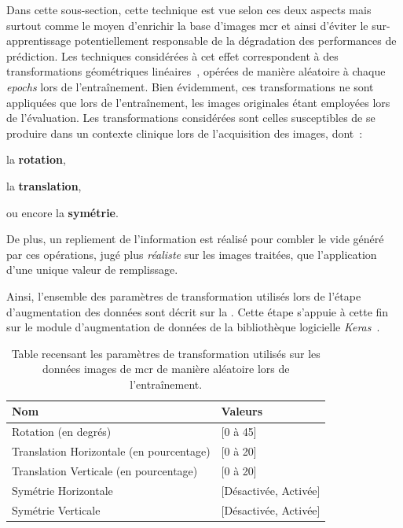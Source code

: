 Dans cette sous-section, cette technique est vue selon ces deux aspects mais surtout comme le moyen d'enrichir la base d'images \gls{mcr} et ainsi d'éviter le sur-apprentissage potentiellement responsable de la dégradation des performances de prédiction. Les techniques considérées à cet effet correspondent à des transformations géométriques linéaires~\cite{Taylor2018}, opérées de manière aléatoire à chaque \textit{epochs} lors de l'entraînement. Bien évidemment, ces transformations ne sont appliquées que lors de l'entraînement, les images originales étant employées lors de l'évaluation. Les transformations considérées sont celles susceptibles de se produire dans un contexte clinique lors de l'acquisition des images, dont~:
\begin{inlinerate}
    \item la \textbf{rotation},
    \item la \textbf{translation},
    \item ou encore la \textbf{symétrie}.
\end{inlinerate} De plus, un repliement de l'information est réalisé pour combler le vide généré par ces opérations, jugé plus \textit{réaliste} sur les images traitées, que l'application d'une unique valeur de remplissage.\par

Ainsi, l'ensemble des paramètres de transformation utilisés lors de l'étape d'augmentation des données sont décrit sur la . Cette étape s'appuie à cette fin sur le module d'augmentation de données de la bibliothèque logicielle \textit{Keras}~\cite{chollet2015}.\par

\begin{table}[H]
    \centering
    \begin{tabular}{ll}
        \toprule
        \textbf{Nom}                            & \textbf{Valeurs}      \\ \midrule
        Rotation (en degrés)                    & [0 à 45]              \\ 
        Translation Horizontale (en pourcentage)& [0 à 20]              \\ 
        Translation Verticale (en pourcentage)  & [0 à 20]              \\  
        Symétrie Horizontale                    & [Désactivée, Activée]  \\  
        Symétrie Verticale                      & [Désactivée, Activée]  \\ 
        \bottomrule 
    \end{tabular} 
    \caption{Table recensant les paramètres de transformation utilisés sur les données images de \gls{mcr} de manière aléatoire lors de l'entraînement.}
    \label{tab:parameters_image_improvement_data_augmentation}
\end{table}\par

